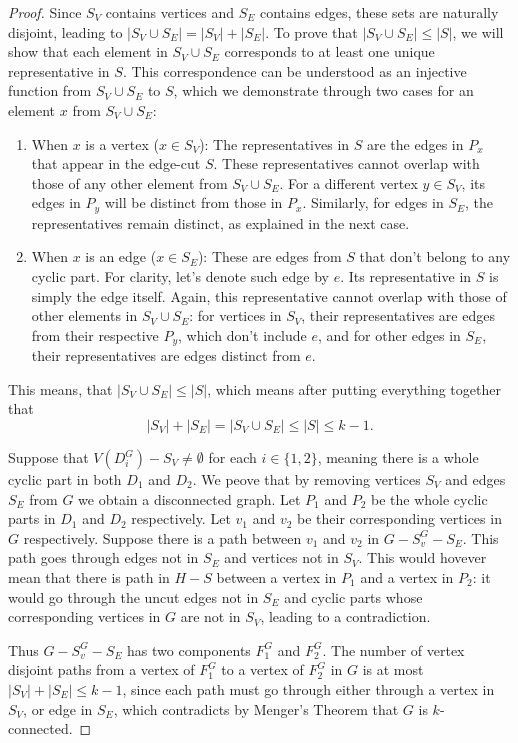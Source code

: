 \documentclass[12pt, twoside]{book}
\begin{document}
\begin{proof}
	Since $S_V$ contains vertices and $S_E$ contains edges, these sets are naturally disjoint, leading to $|S_V\cup S_E|=|S_V|+|S_E|$. To prove that $|S_V\cup S_E|\leq |S|$, we will show that each element in $S_V\cup S_E$ corresponds to at least one unique representative in $S$. This correspondence can be understood as an injective function from $S_V\cup S_E$ to $S$, which we demonstrate through two cases for an element $x$ from $S_V\cup S_E$:
	\begin{enumerate}
		\item When $x$ is a vertex ($x\in S_V$): The representatives in $S$ are the edges in $P_x$ that appear in the edge-cut $S$. These representatives cannot overlap with those of any other element from $S_V\cup S_E$. For a different vertex $y\in S_V$, its edges in $P_y$ will be distinct from those in $P_x$. Similarly, for edges in $S_E$, the representatives remain distinct, as explained in the next case.
		\item When $x$ is an edge ($x\in S_E$): These are edges from $S$ that don't belong to any cyclic part. For clarity, let's denote such edge by $e$. Its representative in $S$ is simply the edge itself. Again, this representative cannot overlap with those of other elements in $S_V\cup S_E$: for vertices in $S_V$, their representatives are edges from their respective $P_y$, which don't include $e$, and for other edges in $S_E$, their representatives are edges distinct from $e$.
	\end{enumerate} 
	
	This means, that $|S_V\cup S_E|\leq |S|$, which means after putting everything together that $$|S_V|+|S_E|=|S_V\cup S_E|\leq |S|\leq k-1.$$
	
	Suppose that $V(D_i^G)-S_V\neq\emptyset$ for each $i\in \{1,2\}$, meaning there is a whole cyclic part in both $D_1$ and $D_2$. We peove that by removing vertices $S_V$ and edges $S_E$ from $G$ we obtain a disconnected graph. Let $P_1$ and $P_2$ be the whole cyclic parts in $D_1$ and $D_2$ respectively. Let $v_1$ and $v_2$ be their corresponding vertices in $G$ respectively. Suppose there is a path between $v_1$ and $v_2$ in $G-S_v^G-S_E$. This path goes through edges not in $S_E$ and vertices not in $S_V$. This would hovever mean that there is path in $H-S$ between a vertex in $P_1$ and a vertex in $P_2$: it would go through the uncut edges not in $S_E$ and cyclic parts whose corresponding vertices in $G$ are not in $S_V$, leading to a contradiction.
	
	Thus $G-S_v^G-S_E$ has two components $F_1^G$ and $F_2^G$. The number of vertex disjoint paths from a vertex of $F_1^G$ to a vertex of $F_2^G$ in $G$ is at most $|S_V|+|S_E|\leq k-1$, since each path must go through either through a vertex in $S_V$, or edge in $S_E$, which contradicts by Menger's Theorem that $G$ is $k$-connected.
	

\end{proof}
\end{document}
